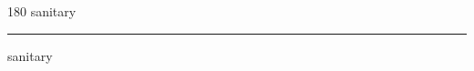 
\begin{frame}
\begin{center}
\begin{turn}{180}
{\fontsize{2.5cm}{1em}\selectfont sanitary}
\end{turn}
\vspace{1em}\par  
\hrule
\vspace{1em}\par  
{\fontsize{2.5cm}{1em}\selectfont sanitary}
\end{center}
\end{frame}
